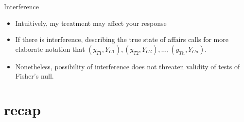 \begin{frame}{Interference}
  \begin{itemize}
    \item Intuitively, my treatment may affect your response
  \item If there is interference, describing the true state of affairs calls for more elaborate notation that $(y_{T1}, Y_{C1}), (y_{T2}, Y_{C2}), \ldots, (y_{Tn}, Y_{Cn}).$
  \item Nonetheless, possibility of interference does not threaten validity of tests of Fisher's null.
  \end{itemize}
\end{frame}

\section*{recap}



